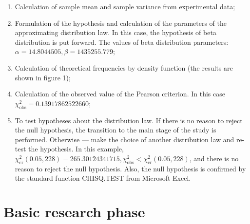 \documentclass[a4paper]{article}
\begin{document}
\begin{enumerate}
	\item Calculation of sample mean and sample variance from experimental data;
	
	\item Formulation of the hypothesis and calculation of the parameters of the approximating distribution law. In this case, the hypothesis of beta distribution is put forward. The values of beta distribution parameters: $\alpha = 14.8044505, \beta = 1435255.779$;
	
	\item Calculation of theoretical frequencies by density function (the results are shown in figure 1);

	\item Calculation of the observed value of the Pearson criterion. In this case \\ $\chi_{\text{obs}}^2 = 0.13917862522660$;
	
	\item To test hypotheses about the distribution law. If there is no reason to reject the null hypothesis, the transition to the main stage of the study is performed. Otherwise --- make the choice of another distribution law and re-test the hypothesis. In this example, $\chi_{\text{cr}}^2(0.05, 228) = 265.30124341715, \chi_{\text{obs}}^2 < \chi_{\text{cr}}^2(0.05, 228)$, and there is no reason to reject the null hypothesis. Also, the null hypothesis is confirmed by the standard function CHISQ.TEST from Microsoft Excel.
\end{enumerate}

\section{Basic research phase} \label{sec:analysis_part_2}
\end{document}
